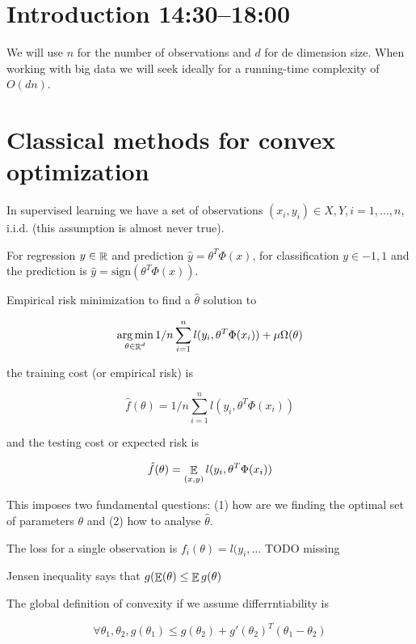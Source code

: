 \documentclass[b5paper]{report}
\begin{document}
\section{Introduction 14:30--18:00}

We will use $n$ for the number of observations and $d$ for de dimension size.
When working with big data we will seek ideally for a running-time complexity
of $O(dn)$.


\section{Classical methods for convex optimization}

In supervised learning we have a set of observations $(x_i, y_i) \in X, Y,
i=1,\dots,n$, i.i.d. (this assumption is almost never true).

For regression $y \in \operatorname*{\mathbb{\mathop{R}}}$ and prediction $\hat{y} = \theta^T \Phi(x)$, for
classification $y \in {-1, 1}$ and the prediction is $\hat{y} =
\text{sign}(\theta^T \Phi(x))$.

Empirical risk minimization to find a $\hat{\theta}$ solution to

\begin{equation}
  \operatorname*{arg\,min}_{\theta \in \operatorname*{\mathbb{\mathop{R}}}^d} 1/n \sum_{i=1}^n l(y_i, \theta^T \Phi(x_i)) +
    \mu \Omega(\theta)
\end{equation}

the training cost (or empirical risk) is

\begin{equation}
  \hat{f}(\theta) = 1/n \sum_{i=1}^n l(y_i, \theta^T \Phi(x_i))
\end{equation}

and the testing cost or expected risk is

\begin{equation}
  \hat{f}(\theta) = \operatorname*{\mathbb{\mathop{E}}}_{(x,y)}l(y_i, \theta^T \Phi(x_i))
\end{equation}

This imposes two fundamental questions: (1) how are we finding the optimal set
of parameters $\theta$ and (2) how to analyse $\hat{\theta}$.

The loss for a single observation is $f_i(\theta) = l(y_i, \dots$ TODO missing

Jensen inequality says that $g(\operatorname*{\mathbb{\mathop{E}}}(\theta) \le \operatorname*{\mathbb{\mathop{E}}} g(\theta)$

The global definition of convexity if we assume differrntiability is

\begin{equation}
  \forall \theta_1, \theta_2, g(\theta_1) \le g(\theta_2) + g'(\theta_2)^T(\theta_1 - \theta_2)
\end{equation}
\end{document}
